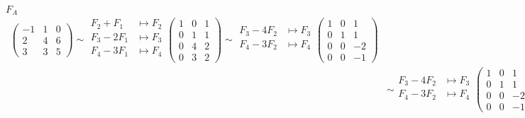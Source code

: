 \begin{mathcase}{\(F_A\)}
\[\begin{aligned}
\begin{pmatrix}
                    -1 & 1 & 0 \\
                    2 & 4 & 6 \\
                    3 & 3 & 5
                \end{pmatrix}
                \sim
                \begin{aligned}
                    F_2 + F_1 &\mapsto F_2 \\
                    F_3 - 2F_1 &\mapsto F_3 \\
                    F_4 - 3F_1 &\mapsto F_4 \\
                \end{aligned}
                \begin{pmatrix}
                    1 & 0 & 1 \\
                    0 & 1 & 1 \\
                    0 & 4 & 2 \\
                    0 & 3 & 2
                \end{pmatrix}
                \sim
                \begin{aligned}
                    F_3 - 4F_2 &\mapsto F_3 \\
                    F_4 - 3F_2 &\mapsto F_4 \\
                \end{aligned}
                \begin{pmatrix}
                    1 & 0 & 1 \\
                    0 & 1 & 1 \\
                    0 & 0 & -2 \\
                    0 & 0 & -1
                \end{pmatrix}
                \\
                &\sim
                \begin{aligned}
                    F_3 - 4F_2 &\mapsto F_3 \\
                    F_4 - 3F_2 &\mapsto F_4 \\
                \end{aligned}
                \begin{pmatrix}
                    1 & 0 & 1 \\
                    0 & 1 & 1 \\
                    0 & 0 & -2 \\
                    0 & 0 & -1
                \end{pmatrix}
                \sim

\end{aligned}\]
\end{mathcase}
